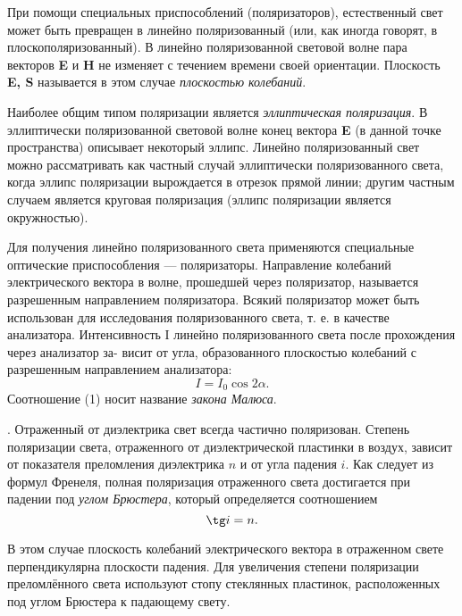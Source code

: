 \documentclass[a4paper]{article}
\begin{document}
При помощи специальных приспособлений (поляризаторов), естественный свет может быть превращен в линейно поляризованный (или, как иногда говорят, в плоскополяризованный). В линейно поляризованной световой волне пара векторов \textbf{E} и \textbf{H} не изменяет с течением времени своей ориентации. Плоскость \textbf{E, S} называется в этом случае \textit{плоскостью колебаний}. \par
Наиболее общим типом поляризации является \textit{эллиптическая поляризация}. В эллиптически поляризованной световой волне конец вектора
\textbf{E} (в данной точке пространства) описывает некоторый эллипс. Линейно
поляризованный свет можно рассматривать как частный случай эллиптически поляризованного света, когда эллипс поляризации вырождается в отрезок прямой линии; другим частным случаем является круговая
поляризация (эллипс поляризации является окружностью). \par
Для получения линейно поляризованного света применяются специальные оптические приспособления — поляризаторы. Направление колебаний электрического вектора в волне, прошедшей через поляризатор, называется
разрешенным направлением поляризатора.
Всякий поляризатор может быть использован для исследования поляризованного света, т. е. в качестве анализатора. Интенсивность I линейно поляризованного света после прохождения через анализатор за-
висит от угла, образованного плоскостью колебаний с разрешенным направлением анализатора:
\begin{equation}
  I = I_0 \cos 2\alpha.  
\end{equation}
Соотношение (1) носит название \textit{закона Малюса}. \par
. Отраженный от диэлектрика свет всегда частично поляризован. Степень поляризации света, отраженного от диэлектрической пластинки в воздух, зависит от показателя преломления диэлектрика $n$ и от угла падения $i$. Как следует из формул Френеля, полная поляризация отраженного света достигается
при падении под \textit{углом Брюстера}, который определяется соотношением
\begin{equation}
 \tg i = n.   
\end{equation}

В этом случае плоскость колебаний электрического вектора в отраженном свете перпендикулярна плоскости падения. Для увеличения степени поляризации преломлённого
света используют стопу стеклянных пластинок, расположенных под углом Брюстера к падающему свету. \par
\end{document}

